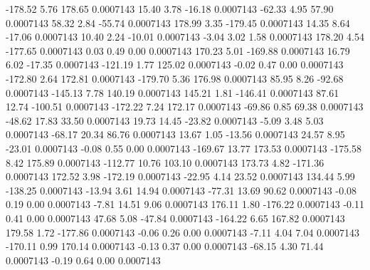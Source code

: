      -178.52        5.76      178.65     0.0007143
       15.40        3.78      -16.18     0.0007143
      -62.33        4.95       57.90     0.0007143
       58.32        2.84      -55.74     0.0007143
      178.99        3.35     -179.45     0.0007143
       14.35        8.64      -17.06     0.0007143
       10.40        2.24      -10.01     0.0007143
       -3.04        3.02        1.58     0.0007143
      178.20        4.54     -177.65     0.0007143
        0.03        0.49        0.00     0.0007143
      170.23        5.01     -169.88     0.0007143
       16.79        6.02      -17.35     0.0007143
     -121.19        1.77      125.02     0.0007143
       -0.02        0.47        0.00     0.0007143
     -172.80        2.64      172.81     0.0007143
     -179.70        5.36      176.98     0.0007143
       85.95        8.26      -92.68     0.0007143
     -145.13        7.78      140.19     0.0007143
      145.21        1.81     -146.41     0.0007143
       87.61       12.74     -100.51     0.0007143
     -172.22        7.24      172.17     0.0007143
      -69.86        0.85       69.38     0.0007143
      -48.62       17.83       33.50     0.0007143
       19.73       14.45      -23.82     0.0007143
       -5.09        3.48        5.03     0.0007143
      -68.17       20.34       86.76     0.0007143
       13.67        1.05      -13.56     0.0007143
       24.57        8.95      -23.01     0.0007143
       -0.08        0.55        0.00     0.0007143
     -169.67       13.77      173.53     0.0007143
     -175.58        8.42      175.89     0.0007143
     -112.77       10.76      103.10     0.0007143
      173.73        4.82     -171.36     0.0007143
      172.52        3.98     -172.19     0.0007143
      -22.95        4.14       23.52     0.0007143
      134.44        5.99     -138.25     0.0007143
      -13.94        3.61       14.94     0.0007143
      -77.31       13.69       90.62     0.0007143
       -0.08        0.19        0.00     0.0007143
       -7.81       14.51        9.06     0.0007143
      176.11        1.80     -176.22     0.0007143
       -0.11        0.41        0.00     0.0007143
       47.68        5.08      -47.84     0.0007143
     -164.22        6.65      167.82     0.0007143
      179.58        1.72     -177.86     0.0007143
       -0.06        0.26        0.00     0.0007143
       -7.11        4.04        7.04     0.0007143
     -170.11        0.99      170.14     0.0007143
       -0.13        0.37        0.00     0.0007143
      -68.15        4.30       71.44     0.0007143
       -0.19        0.64        0.00     0.0007143
